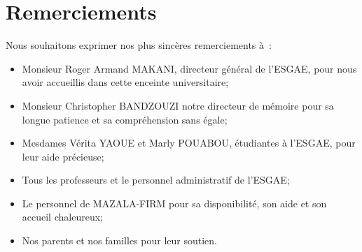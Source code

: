\chapter*{Remerciements}

Nous souhaitons exprimer nos plus sincères remerciements à :

\begin{itemize}
  \item Monsieur Roger Armand MAKANI, directeur général de l’ESGAE,
      pour nous avoir accueillis dans cette enceinte universitaire;

  \item Monsieur Christopher BANDZOUZI notre directeur de mémoire pour sa
      longue patience et sa compréhension sans égale;

  \item Mesdames Vérita YAOUE et Marly POUABOU, étudiantes à l’ESGAE, pour
      leur aide précieuse;

  \item Tous les professeurs et le personnel administratif de l’ESGAE;


  \item
      Le personnel de MAZALA-FIRM pour sa disponibilité, son aide et son
      accueil chaleureux;

  \item
      Nos parents et nos familles pour leur soutien.

\end{itemize}
